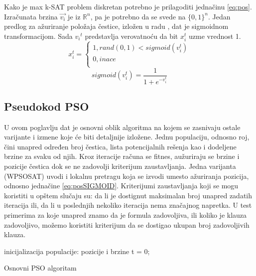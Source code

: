 \documentclass{article}
\begin{document}
Kako je max k-SAT problem diskretan potrebno je prilagoditi jednačinu \ref{eq:pos}. Izračunata brzina $\vec{v_{i}}$ je iz $\mathbb{R}^n$, pa je potrebno da se svede na $\{ 0,1 \}^n$. Jedan predlog za ažuriranje položaja čestice, izložen u radu \cite{sigmoid}, dat je sigmoidnom transformacijom. Sada ${v_{i}}^{t}$ predstavlja verovatnoću da bit $x_{i}^{t}$ uzme vrednost 1.  \\

\begin{equation}\label{eq:posSIGMOID}
x_{i}^{t}=\begin{cases}
               1, rand(0,1) < sigmoid(v_{i}^{t})\\
               0, inace\\
            \end{cases}
\end{equation}\label{eq:sigmoid}
\begin{equation}
sigmoid(v_{i}^{t}) = \frac{1}{1+e^{-v_{i}^{t}}}
\end{equation}
 
 
\subsection{Pseudokod PSO}
U ovom poglavlju dat je osnovni oblik algoritma na kojem se zasnivaju ostale varijante i izmene koje će biti detaljnije izložene. Jednu populaciju, odnosno roj, čini unapred određen broj čestica, lista potencijalnih rešenja kao i dodeljene brzine za svaku od njih. 
Kroz iteracije računa se fitnes, aužuriraju se brzine i pozicije čestica dok se ne zadovolji kriterijum zaustavljanja. 
Jedna varijanta (WPSOSAT) uvodi i lokalnu pretragu koja se izvodi umesto ažuriranja pozicija, odnosno jednačine \ref{eq:posSIGMOID}.
Kriterijumi zaustavljanja koji se mogu koristiti u opštem slučaju su: da li je dostignut maksimalan broj unapred zadatih iteracija ili, da li u poslednjih nekoliko iteracija nema značajnog napretka.
U test primerima za koje unapred znamo da je formula zadovoljiva, ili koliko je klauza zadovoljivo, možemo koristiti kriterijum da se dostigao ukupan broj zadovoljivih klauza. \\

\begin{algorithm}[H]
\SetAlgoLined
{}

\BlankLine
 inicijalizacija populacije: pozicije i brzine\;
 t = 0; \\
\caption{Osnovni PSO algoritam}
\end{algorithm}
\end{document}
